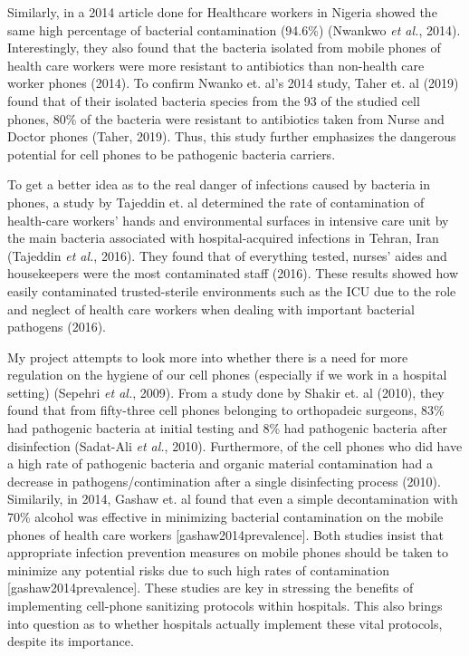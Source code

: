 \documentclass[]{article}
\begin{document}
Similarly, in a 2014 article done for Healthcare workers in Nigeria
showed the same high percentage of bacterial contamination (94.6\%)
(Nwankwo \emph{et al.}, 2014). Interestingly, they also found that the
bacteria isolated from mobile phones of health care workers were more
resistant to antibiotics than non-health care worker phones (2014). To
confirm Nwanko et. al's 2014 study, Taher et. al (2019) found that of
their isolated bacteria species from the 93 of the studied cell phones,
80\% of the bacteria were resistant to antibiotics taken from Nurse and
Doctor phones (Taher, 2019). Thus, this study further emphasizes the
dangerous potential for cell phones to be pathogenic bacteria carriers.

To get a better idea as to the real danger of infections caused by
bacteria in phones, a study by Tajeddin et. al determined the rate of
contamination of health-care workers' hands and environmental surfaces
in intensive care unit by the main bacteria associated with
hospital-acquired infections in Tehran, Iran (Tajeddin \emph{et al.},
2016). They found that of everything tested, nurses' aides and
housekeepers were the most contaminated staff (2016). These results
showed how easily contaminated trusted-sterile environments such as the
ICU due to the role and neglect of health care workers when dealing with
important bacterial pathogens (2016).

My project attempts to look more into whether there is a need for more
regulation on the hygiene of our cell phones (especially if we work in a
hospital setting) (Sepehri \emph{et al.}, 2009). From a study done by
Shakir et. al (2010), they found that from fifty-three cell phones
belonging to orthopadeic surgeons, 83\% had pathogenic bacteria at
initial testing and 8\% had pathogenic bacteria after disinfection
(Sadat-Ali \emph{et al.}, 2010). Furthermore, of the cell phones who did
have a high rate of pathogenic bacteria and organic material
contamination had a decrease in pathogens/contimination after a single
disinfecting process (2010). Similarily, in 2014, Gashaw et. al found
that even a simple decontamination with 70\% alcohol was effective in
minimizing bacterial contamination on the mobile phones of health care
workers {[}gashaw2014prevalence{]}. Both studies insist that appropriate
infection prevention measures on mobile phones should be taken to
minimize any potential risks due to such high rates of contamination
{[}gashaw2014prevalence{]}. These studies are key in stressing the
benefits of implementing cell-phone sanitizing protocols within
hospitals. This also brings into question as to whether hospitals
actually implement these vital protocols, despite its importance.
\end{document}
